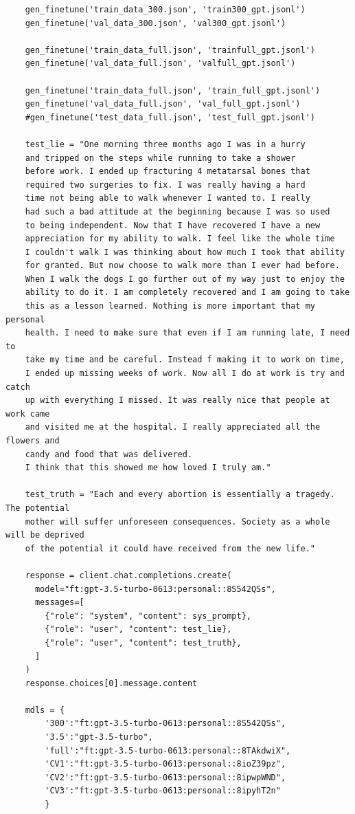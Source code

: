 \documentclass[10pt,twocolumn,letterpaper]{article}
\begin{document}
\begin{verbatim}
    gen_finetune('train_data_300.json', 'train300_gpt.jsonl')
    gen_finetune('val_data_300.json', 'val300_gpt.jsonl')
    
    gen_finetune('train_data_full.json', 'trainfull_gpt.jsonl')
    gen_finetune('val_data_full.json', 'valfull_gpt.jsonl')
    
    gen_finetune('train_data_full.json', 'train_full_gpt.jsonl')
    gen_finetune('val_data_full.json', 'val_full_gpt.jsonl')
    #gen_finetune('test_data_full.json', 'test_full_gpt.jsonl')
    
    test_lie = "One morning three months ago I was in a hurry 
    and tripped on the steps while running to take a shower 
    before work. I ended up fracturing 4 metatarsal bones that 
    required two surgeries to fix. I was really having a hard 
    time not being able to walk whenever I wanted to. I really
    had such a bad attitude at the beginning because I was so used
    to being independent. Now that I have recovered I have a new
    appreciation for my ability to walk. I feel like the whole time
    I couldn't walk I was thinking about how much I took that ability 
    for granted. But now choose to walk more than I ever had before. 
    When I walk the dogs I go further out of my way just to enjoy the 
    ability to do it. I am completely recovered and I am going to take 
    this as a lesson learned. Nothing is more important that my personal 
    health. I need to make sure that even if I am running late, I need to
    take my time and be careful. Instead f making it to work on time, 
    I ended up missing weeks of work. Now all I do at work is try and catch
    up with everything I missed. It was really nice that people at work came
    and visited me at the hospital. I really appreciated all the flowers and
    candy and food that was delivered. 
    I think that this showed me how loved I truly am."

    test_truth = "Each and every abortion is essentially a tragedy. The potential 
    mother will suffer unforeseen consequences. Society as a whole will be deprived
    of the potential it could have received from the new life."

    response = client.chat.completions.create(
      model="ft:gpt-3.5-turbo-0613:personal::8S542QSs",
      messages=[
        {"role": "system", "content": sys_prompt},
        {"role": "user", "content": test_lie},
        {"role": "user", "content": test_truth},
      ]
    )
    response.choices[0].message.content
    
    mdls = {
        '300':"ft:gpt-3.5-turbo-0613:personal::8S542QSs",
        '3.5':"gpt-3.5-turbo",
        'full':"ft:gpt-3.5-turbo-0613:personal::8TAkdwiX",
        'CV1':"ft:gpt-3.5-turbo-0613:personal::8ioZ39pz",
        'CV2':"ft:gpt-3.5-turbo-0613:personal::8ipwpWND",
        'CV3':"ft:gpt-3.5-turbo-0613:personal::8ipyhT2n"
        }
    

\end{verbatim}
\end{document}
